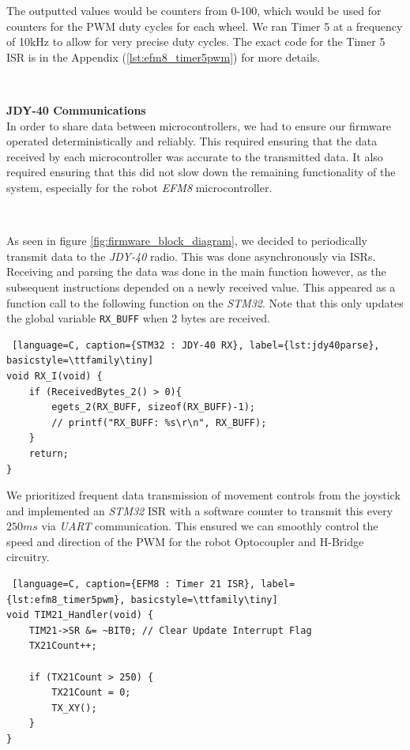 \documentclass{article}
\begin{document}
The outputted values would be counters from 0-100, which would be used for counters for the PWM duty cycles for each wheel. We ran Timer 5 at a frequency of 10kHz to allow for very precise duty cycles. The exact code for the Timer 5 ISR is in the Appendix (\ref{lst:efm8_timer5pwm}) for more details.

\

\textbf{JDY-40 Communications} \\


In order to share data between microcontrollers, we had to ensure our firmware operated deterministically and reliably.
This required ensuring that the data received by each microcontroller was accurate to the transmitted data. It also required ensuring
that this did not slow down the remaining functionality of the system, especially for the robot \textit{EFM8} microcontroller.

\

As seen in figure \ref{fig:firmware_block_diagram}, we decided to periodically transmit data to the \textit{JDY-40} radio. This was done
asynchronously via ISRs. Receiving and parsing the data was done in the main function however,
as the subsequent instructions depended on a newly received value. This appeared as a function call to the following function on the \textit{STM32}.
Note that this only updates the global variable \texttt{RX\_BUFF} when 2 bytes are received.

\begin{lstlisting} [language=C, caption={STM32 : JDY-40 RX}, label={lst:jdy40parse}, basicstyle=\ttfamily\tiny]
void RX_I(void) {
	if (ReceivedBytes_2() > 0){
		egets_2(RX_BUFF, sizeof(RX_BUFF)-1);
		// printf("RX_BUFF: %s\r\n", RX_BUFF);
	}
	return;
}
\end{lstlisting}

We prioritized frequent data transmission of movement controls from the joystick and implemented an \textit{STM32} ISR with a software counter
to transmit this every $250 ms$ via \textit{UART} communication. This ensured we can smoothly control the speed and
direction of the PWM for the robot Optocoupler and H-Bridge circuitry.

\begin{lstlisting} [language=C, caption={EFM8 : Timer 21 ISR}, label={lst:efm8_timer5pwm}, basicstyle=\ttfamily\tiny]
void TIM21_Handler(void) {
	TIM21->SR &= ~BIT0; // Clear Update Interrupt Flag
	TX21Count++;

	if (TX21Count > 250) {
		TX21Count = 0;
		TX_XY();
	}
}
\end{lstlisting}
\end{document}
